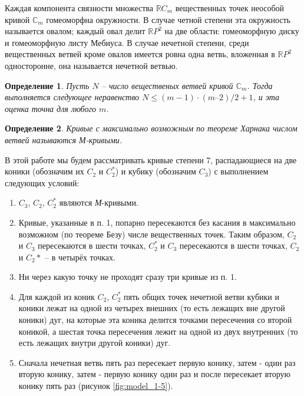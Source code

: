 \documentclass[11pt]{book}
\newtheorem{definition}{Определение}
\numberwithin{exercise}{chapter}
\begin{document}
Каждая компонента связности множества  $\mathbb RC_m$ вещественных точек неособой кривой $\mathbb C_m$ гомеоморфна окружности. В случае четной степени эта окружность называется овалом; каждый овал делит $\mathbb RP^2$ на две области: гомеоморфную диску и гомеоморфную листу Мебиуса. В случае нечетной степени, среди вещественных ветвей кроме овалов имеется ровна одна ветвь, вложенная в $\mathbb RP^2$ односторонне, она называется нечетной ветвью.

\begin{definition}
Пусть $N$ – число вещественых ветвей кривой $\mathbb C_m$. Тогда выполняется следующее неравенство $N \leqslant (m-1) \cdot (m – 2)/2 + 1$, и эта оценка точна для любого $m$.
\end{definition}

\begin{definition}
Кривые с максимально возможным по теореме Харнака числом ветвей называются М-кривыми.
\end{definition}

В этой работе мы будем рассматривать кривые степени 7, распадающиеся на две коники (обозначим их $C_2$ и $C_2^*$) и кубику (обозначим $C_3$) с выполнением следующих условий:

\begin{enumerate}
\item $C_3$, $C_2$, $C_2^*$ являются \textit{М}-кривыми.
\item Кривые, указанные в п. 1, попарно пересекаются без касания в максимально возможном (по теореме Безу) числе вещественных точек. Таким образом, $C_2$ и $C_3$ пересекаются в шести точках, $C_2^*$ и $C_3$ пересекаются в шести точках, $C_2$ и $C_2*$ – в  четырёх точках. 
\item Ни через какую точку не проходят сразу три кривые из п. 1.
\item Для каждой из коник $C_2$, $C_2^*$ пять общих точек нечетной ветви кубики и коники лежат на одной из четырех внешних (то есть лежащих вне другой коники) дуг, на которые эта коника делится точками пересечения со второй коникой, а шестая точка пересечения лежит на одной из двух внутренних (то есть лежащих внутри другой коники) дуг.
\item Сначала нечетная ветвь пять раз пересекает первую конику, затем - один раз вторую конику, затем - первую конику один раз  и после пересекает вторую конику пять раз (рисунок \ref{fig:model_1-5}).
\end{enumerate}
\end{document}
